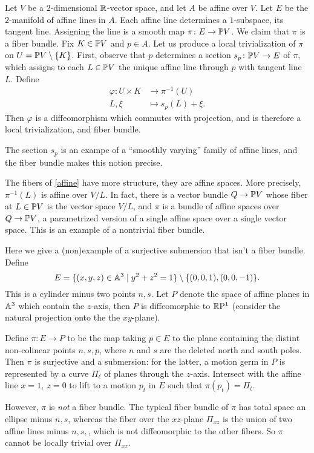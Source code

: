 \begin{example}\label{affine} 
    Let $V$ be a $2$-dimensional $\R$-vector space, and let $A$ be affine over $V$. Let $E$ be the $2$-manifold of affine lines in $A$. Each affine line determines a $1$-subspace, its tangent line. Assigning the line is a smooth map $\pi \colon E \to \P V$. We claim that $\pi$ is a fiber bundle. Fix $K \in \P V$ and $p \in A$. Let us produce a local trivialization of $\pi$ on $U= \P V \setminus \{K\} $. First, observe that $p$ determines a section $s_p \colon \P V \to E$ of $\pi$, which assigns to each $L \in \P V$ the unique affine line through $p$ with tangent line $L$. Define 
    \begin{align*}
        \varphi  \colon U\times K &\to \pi ^{-1}(U)\\
        L, \xi & \mapsto s_p(L)+\xi.
    \end{align*}Then $\varphi $ is a diffeomorphism which commutes with projection, and is therefore a local trivialization, and fiber bundle.
\end{example}
\begin{remark}
    The section $s_p$ is an exampe of a ``smoothly varying'' family of affine lines, and the fiber bundle makes this notion precise.
\end{remark}
\begin{remark}
    The fibers of \cref{affine} have more structure, they are affine spaces. More precisely, $\pi ^{-1}(L)$ is affine over $V /L$. In fact, there is a vector bundle $Q \to \P V$ whose fiber at $L \in \P V$ is the vector space $V /L$, and $\pi$ is a bundle of affine spaces over $Q \to \P V$, a parametrized version of a single affine space over a single vector space. This is an example of a nontrivial fiber bundle.
\end{remark}
\begin{example}[Nonexample no.1]
    Here we give a (non)example of a surjective submersion that isn't a fiber bundle. Define \[
        E= \{(x,y,z) \in \A^3\mid y^2+z^2=1\}  \setminus \{(0,0,1),(0,0,-1)\} .
    \] This is a cylinder minus two points $n,s$. Let $P$ denote the space of affine planes in $\A^3$ which contain the $z$-axis, then $P$ is diffeomorphic to $\R \mathrm P^1$ (consider the natural projection onto the the $xy$-plane). 

    Define $\pi \colon E \to P$ to be the map taking $p \in E$ to the plane containing the distint non-colinear points $n,s,p$, where $n$ and $s$ are the deleted north and south poles. Then $\pi$ is surjective and a submersion: for the latter, a motion germ in $P$ is represented by a curve $\Pi _{\ell}$ of planes through the $z$-axis. Intersect with the affine line $x=1, \ z=0$ to lift to a motion $p_t$ in $E$ such that $\pi(p_t)=\Pi_t$.

    However, $\pi$ is \emph{not} a fiber bundle. The typical fiber bundle of $\pi$ has total space an ellipse minus $n,s$, whereas the fiber over the $xz$-plane $\Pi_{xz}$ is the union of two affine lines minus $n,s,$, which is not diffeomorphic to the other fibers. So $\pi$ cannot be locally trivial over $\Pi _{xz}$.
\end{example}

